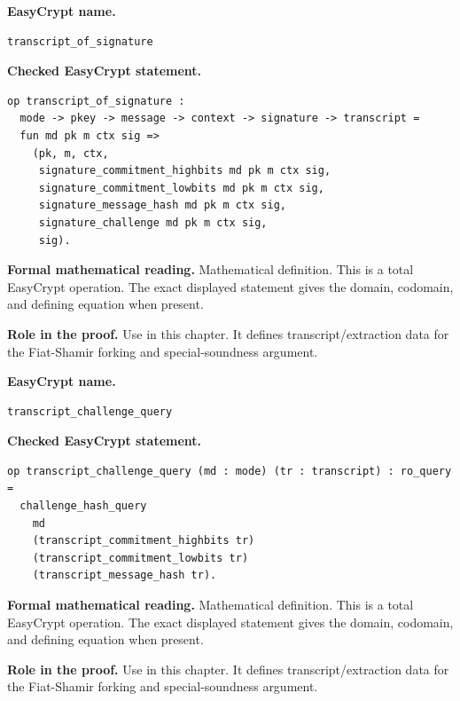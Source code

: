 \begin{formaldefinition}
\noindent\textbf{EasyCrypt name.}
\begin{lstlisting}[language=EasyCrypt,basicstyle=\ttfamily\scriptsize]
transcript_of_signature
\end{lstlisting}
\noindent\textbf{Checked EasyCrypt statement.}
\begin{lstlisting}[language=EasyCrypt,basicstyle=\ttfamily\scriptsize]
op transcript_of_signature :
  mode -> pkey -> message -> context -> signature -> transcript =
  fun md pk m ctx sig =>
    (pk, m, ctx,
     signature_commitment_highbits md pk m ctx sig,
     signature_commitment_lowbits md pk m ctx sig,
     signature_message_hash md pk m ctx sig,
     signature_challenge md pk m ctx sig,
     sig).
\end{lstlisting}
\noindent\textbf{Formal mathematical reading.}
Mathematical definition. This is a total EasyCrypt operation.  The exact displayed statement gives the domain, codomain, and defining equation when present.

\noindent\textbf{Role in the proof.}
Use in this chapter. It defines transcript/extraction data for the Fiat-Shamir forking and special-soundness argument.

\end{formaldefinition}

\begin{formaldefinition}
\noindent\textbf{EasyCrypt name.}
\begin{lstlisting}[language=EasyCrypt,basicstyle=\ttfamily\scriptsize]
transcript_challenge_query
\end{lstlisting}
\noindent\textbf{Checked EasyCrypt statement.}
\begin{lstlisting}[language=EasyCrypt,basicstyle=\ttfamily\scriptsize]
op transcript_challenge_query (md : mode) (tr : transcript) : ro_query =
  challenge_hash_query
    md
    (transcript_commitment_highbits tr)
    (transcript_commitment_lowbits tr)
    (transcript_message_hash tr).
\end{lstlisting}
\noindent\textbf{Formal mathematical reading.}
Mathematical definition. This is a total EasyCrypt operation.  The exact displayed statement gives the domain, codomain, and defining equation when present.

\noindent\textbf{Role in the proof.}
Use in this chapter. It defines transcript/extraction data for the Fiat-Shamir forking and special-soundness argument.

\end{formaldefinition}


